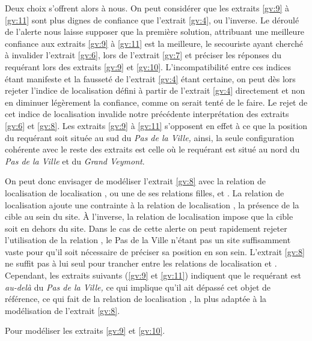Deux choix s'offrent alors à nous. On peut considérer que les extraits
\ref{gv:9} à \ref{gv:11} sont plus dignes de confiance que l'extrait
\ref{gv:4}, ou l'inverse. Le déroulé de l'alerte nous laisse supposer
que la première solution, attribuant une meilleure confiance aux
extraits \ref{gv:9} à \ref{gv:11} est la meilleure, le secouriste
ayant cherché à invalider l'extrait \ref{gv:6}, lors de l'extrait
\ref{gv:7} et préciser les réponses du requérant lors des extraits
\ref{gv:9} et \ref{gv:10}. L'incompatibilité entre ces indices étant
manifeste et la fausseté de l'extrait \ref{gv:4} étant certaine, on
peut dès lors rejeter l'indice de localisation défini à partir de
l'extrait \ref{gv:4} directement et non en diminuer légèrement la
confiance, comme on serait tenté de le faire. Le rejet de cet indice
de localisation invalide notre précédente interprétation des extraits
\ref{gv:6} et \ref{gv:8}. Les extraits \ref{gv:9} à \ref{gv:11}
s'opposent en effet à ce que la position du requérant soit située au
sud du \emph{Pas de la Ville,} ainsi, la seule configuration cohérente
avec le reste des extraits est celle où le requérant est situé au nord
du \emph{Pas de la Ville} et du \emph{Grand Veymont}.

On peut donc envisager de modéliser l'extrait \ref{gv:8} avec la
relation de localisation de localisation , ou
une de ses relations filles,  et
. La relation de localisation
 ajoute une contrainte à la
relation de localisation , la présence de la
cible au sein du site. À l'inverse, la relation de localisation
 impose que la cible soit en dehors
du site. Dans le cas de cette alerte on peut rapidement rejeter
l'utilisation de la relation ,
le Pas de la Ville n'étant pas un site suffisamment vaste pour qu'il
soit nécessaire de préciser sa position en son sein. L'extrait
\ref{gv:8} ne suffit pas à lui seul pour trancher entre les relations
de localisation  et
. Cependant, les extraits suivants
(\ref{gv:9} et \ref{gv:11}) indiquent que le requérant est
\emph{au-delà} du \emph{Pas de la Ville,} ce qui implique qu'il ait
dépassé cet objet de référence, ce qui fait de la relation de
localisation , la plus adaptée à la
modélisation de l'extrait \ref{gv:8}.

Pour modéliser les extraits \ref{gv:9} et \ref{gv:10}.

